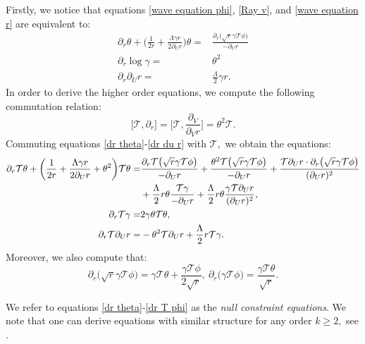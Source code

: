 \documentclass[11pt]{article}
\numberwithin{equation}{section}
\begin{document}
Firstly, we notice that equations \eqref{wave equation phi}, \eqref{Ray v}, and \eqref{wave equation r} are equivalent to:
\begin{align}
    \partial_r\theta+\bigg(\frac{1}{2r}+\frac{\Lambda\gamma r}{2\partial_Ur}\bigg)\theta=&\frac{\partial_r\big(\sqrt{r}\gamma\mathcal{T\phi}\big)}{-\partial_Ur}\label{dr theta}\\
    \partial_r\log\gamma=&\theta^2\label{dr gamma}\\
    \partial_r\partial_Ur=&\frac{\Lambda}{2}\gamma r.\label{dr du r}
\end{align}
In order to derive the higher order equations, we compute the following commutation relation:
\begin{equation}\label{commutation of T and dr}
    \big[\mathcal{T},\partial_r\big]=\bigg[\mathcal{T},\frac{\partial_V}{\partial_Vr}\bigg]=\theta^2\mathcal{T}.
\end{equation}
Commuting equations \eqref{dr theta}-\eqref{dr du r} with $\mathcal{T},$ we obtain the equations:
\begin{align}
    \partial_r\mathcal{T}\theta+\bigg(\frac{1}{2r}+\frac{\Lambda\gamma r}{2\partial_Ur}+\theta^2\bigg)\mathcal{T}\theta=&\frac{\partial_r\mathcal{T}\big(\sqrt{r}\gamma\mathcal{T}\phi\big)}{-\partial_Ur}+\frac{\theta^2\mathcal{T}\big(\sqrt{r}\gamma\mathcal{T}\phi\big)}{-\partial_Ur}+\frac{\mathcal{T}\partial_Ur\cdot\partial_r\big(\sqrt{r}\gamma\mathcal{T\phi}\big)}{(\partial_Ur)^2}\label{dr T theta}\\
    &+\frac{\Lambda}{2}r\theta\frac{\mathcal{T}\gamma}{-\partial_Ur}+\frac{\Lambda}{2}r\theta\frac{\gamma\mathcal{T}\partial_Ur}{(\partial_Ur)^2},\notag\\
    \partial_r\mathcal{T}\gamma=&2\gamma\theta\mathcal{T}\theta,\label{dr T gamma}\\
    \partial_r\mathcal{T}\partial_Ur=& -\theta^2\mathcal{T}\partial_Ur+\frac{\Lambda}{2}r\mathcal{T}\gamma.\label{dr T du r}
\end{align}
Moreover, we also compute that:
\begin{equation}\label{dr T phi}
    \partial_r\big(\sqrt{r}\gamma\mathcal{T\phi}\big)=\gamma\mathcal{T}\theta+\frac{\gamma\mathcal{T}\phi}{2\sqrt{r}},\ \partial_r\big(\gamma\mathcal{T}\phi\big)=\frac{\gamma\mathcal{T}\theta}{\sqrt{r}}.
\end{equation}

We refer to equations \eqref{dr theta}-\eqref{dr T phi} as the \textit{null constraint equations}. We note that one can derive equations with similar structure for any order $k\geq2,$ see . 
\end{document}
